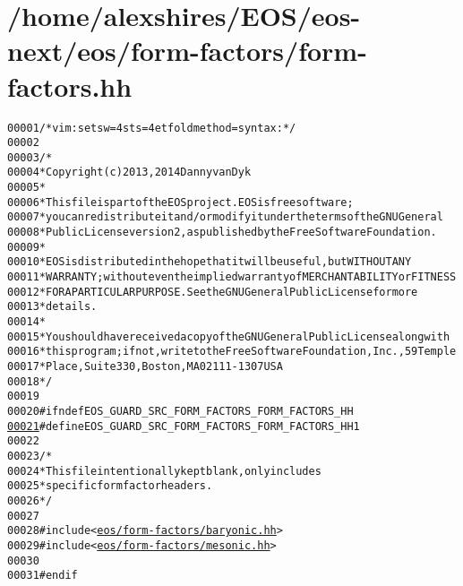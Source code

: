 \hypertarget{form-factors_8hh_source}{
\section{/home/alexshires/EOS/eos-\/next/eos/form-\/factors/form-\/factors.hh}
}


\begin{footnotesize}\begin{alltt}
00001 \textcolor{comment}{/* vim: set sw=4 sts=4 et foldmethod=syntax : */}
00002 
00003 \textcolor{comment}{/*}
00004 \textcolor{comment}{ * Copyright (c) 2013, 2014 Danny van Dyk}
00005 \textcolor{comment}{ *}
00006 \textcolor{comment}{ * This file is part of the EOS project. EOS is free software;}
00007 \textcolor{comment}{ * you can redistribute it and/or modify it under the terms of the GNU General}
00008 \textcolor{comment}{ * Public License version 2, as published by the Free Software Foundation.}
00009 \textcolor{comment}{ *}
00010 \textcolor{comment}{ * EOS is distributed in the hope that it will be useful, but WITHOUT ANY}
00011 \textcolor{comment}{ * WARRANTY; without even the implied warranty of MERCHANTABILITY or FITNESS}
00012 \textcolor{comment}{ * FOR A PARTICULAR PURPOSE.  See the GNU General Public License for more}
00013 \textcolor{comment}{ * details.}
00014 \textcolor{comment}{ *}
00015 \textcolor{comment}{ * You should have received a copy of the GNU General Public License along with}
00016 \textcolor{comment}{ * this program; if not, write to the Free Software Foundation, Inc., 59 Temple}
00017 \textcolor{comment}{ * Place, Suite 330, Boston, MA  02111-1307  USA}
00018 \textcolor{comment}{ */}
00019 
00020 \textcolor{preprocessor}{#ifndef EOS\_GUARD\_SRC\_FORM\_FACTORS\_FORM\_FACTORS\_HH}
\hypertarget{form-factors_8hh_source_l00021}{}\hyperlink{form-factors_8hh_adeada52e36933c7f938e4a38e6b6478d}{00021} \textcolor{preprocessor}{}\textcolor{preprocessor}{#define EOS\_GUARD\_SRC\_FORM\_FACTORS\_FORM\_FACTORS\_HH 1}
00022 \textcolor{preprocessor}{}
00023 \textcolor{comment}{/*}
00024 \textcolor{comment}{ * This file intentionally kept blank, only includes}
00025 \textcolor{comment}{ * specific form factor headers.}
00026 \textcolor{comment}{ */}
00027 
00028 \textcolor{preprocessor}{#include <\hyperlink{baryonic_8hh}{eos/form-factors/baryonic.hh}>}
00029 \textcolor{preprocessor}{#include <\hyperlink{mesonic_8hh}{eos/form-factors/mesonic.hh}>}
00030 
00031 \textcolor{preprocessor}{#endif}
\end{alltt}\end{footnotesize}
